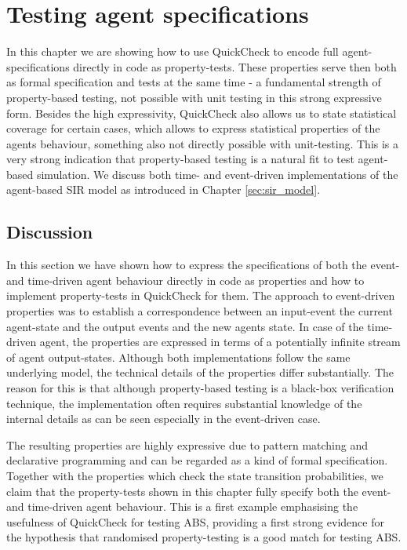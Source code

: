 \chapter{Testing agent specifications}
\label{ch:agentspec}

In this chapter we are showing how to use QuickCheck to encode full agent-specifications directly in code as property-tests. These properties serve then both as formal specification and tests at the same time - a fundamental strength of property-based testing, not possible with unit testing in this strong expressive form. Besides the high expressivity, QuickCheck also allows us to state statistical coverage for certain cases, which allows to express statistical properties of the agents behaviour, something also not directly possible with unit-testing. This is a very strong indication that property-based testing is a natural fit to test agent-based simulation. We discuss both time- and event-driven  implementations of the agent-based SIR model as introduced in Chapter \ref{sec:sir_model}.





\section{Discussion}
In this section we have shown how to express the specifications of both the event- and time-driven agent behaviour directly in code as properties and how to implement property-tests in QuickCheck for them. The approach to event-driven properties was to establish a correspondence between an input-event the current agent-state and the output events and the new agents state. In case of the time-driven agent, the properties are expressed in terms of a potentially infinite stream of agent output-states. Although both implementations follow the same underlying model, the technical details of the properties differ substantially. The reason for this is that although property-based testing is a black-box verification technique, the implementation often requires substantial knowledge of the internal details as can be seen especially in the event-driven case.

The resulting properties are highly expressive due to pattern matching and declarative programming and can be regarded as a kind of formal specification. Together with the properties which check the state transition probabilities, we claim that the property-tests shown in this chapter fully specify both the event- and time-driven agent behaviour. This is a first example emphasising the usefulness of QuickCheck for testing ABS, providing a first strong evidence for the hypothesis that randomised property-testing is a good match for testing ABS.


